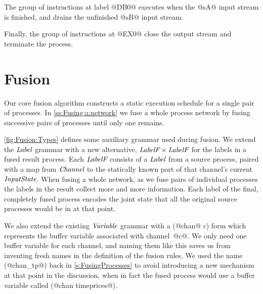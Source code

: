 
The group of instructions at label @DB0@ executes when the @sA@ input stream is finished, and drains the unfinished @sB@ input stream.

Finally, the group of instructions at @EX0@ close the output stream and terminate the process.



\section{Fusion}
\label{s:Fusion}

Our core fusion algorithm constructs a static execution schedule for a single pair of processes.
In \autoref{ss:Fusing:a:network} we fuse a whole process network by fusing successive pairs of processes until only one remains.

\autoref{fig:Fusion:Types} defines some auxiliary grammar used during fusion. We extend the $\textit{Label}$ grammar with a new alternative, $\textit{LabelF} \times \textit{LabelF}$ for the labels in a fused result process. Each $\textit{LabelF}$ consists of a $\textit{Label}$ from a source process, paired with a map from $\textit{Channel}$ to the statically known part of that channel's current $\textit{InputState}$. When fusing a whole network, as we fuse pairs of individual processes the labels in the result collect more and more information. Each label of the final, completely fused process encodes the joint state that all the original source processes would be in at that point.



We also extend the existing $\textit{Variable}$ grammar with a (@chan@ $c$) form which represents the buffer variable associated with \mbox{channel @c@}. We only need one buffer variable for each channel, and naming them like this saves us from inventing fresh names in the definition of the fusion rules.
We used the name (@chan_tp@) back in \autoref{s:FusingProcesses} to avoid introducing a new mechanism at that point in the discussion, when in fact the fused process would use a buffer variable called (@chan timeprices@).

